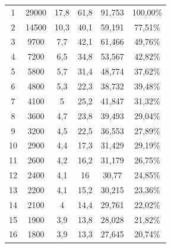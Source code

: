 \begin{longtable}{cccccc}
  1           & 29000                & 17,8          & 61,8           & 91,753        & 100,00\%                        \\
  2           & 14500                & 10,3          & 40,1           & 59,191        & 77,51\%                         \\
  3           & 9700                 & 7,7           & 42,1           & 61,466        & 49,76\%                         \\
  4           & 7200                 & 6,5           & 34,8           & 53,567        & 42,82\%                         \\
  5           & 5800                 & 5,7           & 31,4           & 48,774        & 37,62\%                         \\
  6           & 4800                 & 5,3           & 22,3           & 38,732        & 39,48\%                         \\
  7           & 4100                 & 5             & 25,2           & 41,847        & 31,32\%                         \\
  8           & 3600                 & 4,7           & 23,8           & 39,493        & 29,04\%                         \\
  9           & 3200                 & 4,5           & 22,5           & 36,553        & 27,89\%                         \\
  10          & 2900                 & 4,4           & 17,3           & 31,429        & 29,19\%                         \\
  11          & 2600                 & 4,2           & 16,2           & 31,179        & 26,75\%                         \\
  12          & 2400                 & 4,1           & 16             & 30,77         & 24,85\%                         \\
  13          & 2200                 & 4,1           & 15,2           & 30,215        & 23,36\%                         \\
  14          & 2100                 & 4             & 14,4           & 29,761        & 22,02\%                         \\
  15          & 1900                 & 3,9           & 13,8           & 28,028        & 21,82\%                         \\
  16          & 1800                 & 3,9           & 13,3           & 27,645        & 20,74\%                         \\

\end{longtable}
